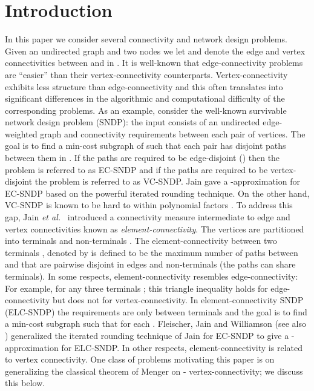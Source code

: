 \documentclass[11pt]{article}
\newcommand{\etal}{{\em et al.}\ }
\begin{document}
\section{Introduction}
In this paper we consider several connectivity and network design
problems. Given an undirected graph  and two nodes  we let
 and  denote the edge and vertex
connectivities between  and  in . It is well-known that
edge-connectivity problems are ``easier'' than their
vertex-connectivity counterparts. Vertex-connectivity exhibits less
structure than edge-connectivity and this often translates into
significant differences in the algorithmic and computational
difficulty of the corresponding problems. As an example, consider the
well-known survivable network design problem (SNDP): the input
consists of an undirected edge-weighted graph  and connectivity
requirements  between each pair of
vertices.  The goal is to find a min-cost subgraph  of  such
that each pair  has  disjoint paths between them in
. If the paths are required to be edge-disjoint () then the problem is referred to as EC-SNDP and if the paths
are required to be vertex-disjoint the problem is referred to as
VC-SNDP.  Jain \cite{Jain} gave a -approximation for EC-SNDP based
on the powerful iterated rounding technique. On the other hand,
VC-SNDP is known to be hard to within polynomial factors
\cite{KortsarzKL,ChakCK08}.  To address this gap, Jain \etal
\cite{JainMVW99} introduced a connectivity measure intermediate to
edge and vertex connectivities known as {\em element-connectivity}.
The vertices are partitioned into terminals  and
non-terminals . The element-connectivity between two
terminals , denoted by  is defined to be the
maximum number of paths between  and  that are pairwise disjoint
in edges and non-terminals (the paths can share terminals). In some
respects, element-connectivity resembles edge-connectivity: For
example,  for any
three terminals ; this triangle inequality holds for
edge-connectivity but does not for vertex-connectivity. In
element-connectivity SNDP (ELC-SNDP) the requirements are only between
terminals and the goal is to find a min-cost subgraph  such that
 for each . Fleischer, Jain and
Williamson \cite{FleischerJW} (see also \cite{CheriyanVV06})
generalized the iterated rounding technique of Jain for EC-SNDP to
give a -approximation for ELC-SNDP.  In other respects,
element-connectivity is related to vertex connectivity. One class of
problems motivating this paper is on generalizing the classical
theorem of Menger on - vertex-connectivity; we discuss this
below.
\end{document}
